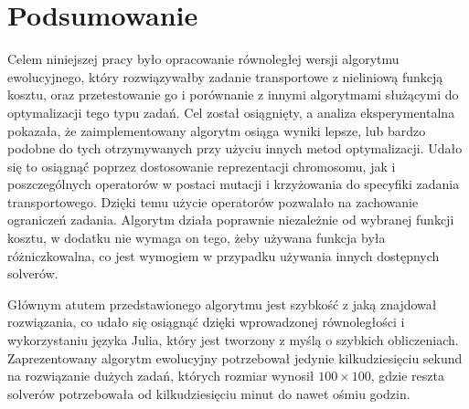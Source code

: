 \chapter{Podsumowanie}
\thispagestyle{chapterBeginStyle}

Celem niniejszej pracy było opracowanie równoległej wersji algorytmu ewolucyjnego, który rozwiązywałby zadanie transportowe z nieliniową funkcją 
kosztu, oraz przetestowanie go i porównanie z innymi algorytmami służącymi do optymalizacji tego typu zadań. Cel został osiągnięty, a analiza 
eksperymentalna pokazała, że zaimplementowany algorytm osiąga wyniki lepsze, lub bardzo podobne do tych otrzymywanych przy użyciu innych 
metod optymalizacji. Udało się to osiągnąć poprzez dostosowanie reprezentacji chromosomu, jak i poszczególnych operatorów w postaci mutacji 
i krzyżowania do specyfiki zadania transportowego. Dzięki temu użycie operatorów pozwalało na zachowanie ograniczeń zadania. Algorytm działa 
poprawnie niezależnie od wybranej funkcji kosztu, w dodatku nie wymaga on tego, żeby używana funkcja była różniczkowalna, co jest wymogiem 
w przypadku używania innych dostępnych solverów.

Głównym atutem przedstawionego algorytmu jest szybkość z jaką znajdował rozwiązania, co udało 
się osiągnąć dzięki wprowadzonej równoległości i wykorzystaniu języka Julia, który jest tworzony z myślą o szybkich obliczeniach. Zaprezentowany 
algorytm ewolucyjny potrzebował jedynie kilkudziesięciu sekund na rozwiązanie dużych zadań, których rozmiar wynosił $100 \times 100$, gdzie reszta 
solverów potrzebowała od kilkudziesięciu minut do nawet ośmiu godzin.



